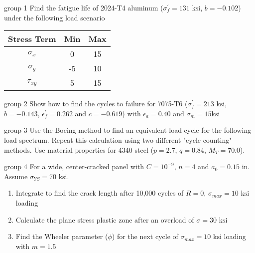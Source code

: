 \documentclass[10pt]{beamer}
\begin{document}
	\begin{frame}{group 1}
		Find the fatigue life of 2024-T4 aluminum ($\sigma_f^\prime = 131 \text{ ksi}$, $b = -0.102$) under the following load scenario
		\begin{table}
		\begin{tabular}{ccc}
			\hline Stress Term & Min & Max \\ 
			\hline $\sigma_x$ & 0 & 15 \\ 
			$\sigma_y$ & -5 & 10 \\ 
			$\tau_{xy}$ & 5 & 15 \\ 
			\hline 
		\end{tabular} 
	\end{table}
	\end{frame}
	
	\begin{frame}{group 2}
		Show how to find the cycles to failure for 7075-T6 ($\sigma_f^\prime = 213 \text{ ksi}$, $b=-0.143$, $\epsilon_f^\prime = 0.262$ and $c=-0.619$) with $\epsilon_a = 0.40$ and $\sigma_m = 15 \text{ksi}$
	\end{frame}
	
	\begin{frame}{group 3}
		Use the Boeing method to find an equivalent load cycle for the following load spectrum.
		Repeat this calculation using two different "cycle counting" methods.
		Use material properties for 4340 steel ($p=2.7$, $q=0.84$, $M_T = 70.0$).
		\begin{figure}[H]
			\centering
		\end{figure}
	\end{frame}
	
	\begin{frame}{group 4}
		For a wide, center-cracked panel with $C=10^{-9}$, $n=4$ and $a_0 = 0.15 \text{ in}$. Assume $\sigma_{YS} = 70 \text{ ksi}$.
		\begin{enumerate}
			\item Integrate to find the crack length after 10,000 cycles of $R=0$, $\sigma_{max} = 10 \text{ ksi}$ loading
			\item Calculate the plane stress plastic zone after an overload of $\sigma = 30 \text{ ksi}$
			\item Find the Wheeler parameter ($\phi$) for the next cycle of $\sigma_{max} = 10 \text{ ksi}$ loading with $m=1.5$
		\end{enumerate}
	\end{frame}
\end{document}
